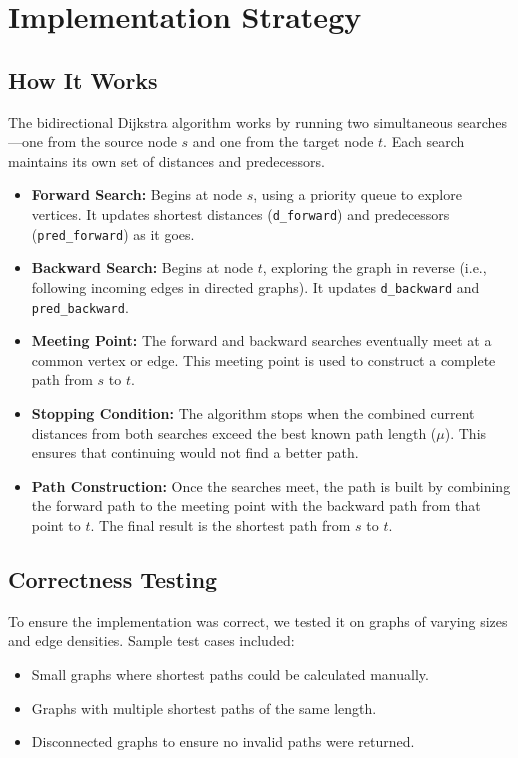 \documentclass[12pt]{article}
\begin{document}
\section{Implementation Strategy}

\subsection{How It Works}
\label{sec:algo}
The bidirectional Dijkstra algorithm works by running two simultaneous searches—one from the source node \( s \) and one from the target node \( t \). Each search maintains its own set of distances and predecessors.

\begin{itemize}
    \item \textbf{Forward Search:} Begins at node \( s \), using a priority queue to explore vertices. It updates shortest distances (\texttt{d\_forward}) and predecessors (\texttt{pred\_forward}) as it goes.
    
    \item \textbf{Backward Search:} Begins at node \( t \), exploring the graph in reverse (i.e., following incoming edges in directed graphs). It updates \texttt{d\_backward} and \texttt{pred\_backward}.

    \item \textbf{Meeting Point:} The forward and backward searches eventually meet at a common vertex or edge. This meeting point is used to construct a complete path from \( s \) to \( t \).

    \item \textbf{Stopping Condition:} The algorithm stops when the combined current distances from both searches exceed the best known path length (\( \mu \)). This ensures that continuing would not find a better path.

    \item \textbf{Path Construction:} Once the searches meet, the path is built by combining the forward path to the meeting point with the backward path from that point to \( t \). The final result is the shortest path from \( s \) to \( t \).
\end{itemize}

\subsection{Correctness Testing}
To ensure the implementation was correct, we tested it on graphs of varying sizes and edge densities. Sample test cases included:
\begin{itemize}
    \item Small graphs where shortest paths could be calculated manually.
    \item Graphs with multiple shortest paths of the same length.
    \item Disconnected graphs to ensure no invalid paths were returned.
\end{itemize}
\end{document}
